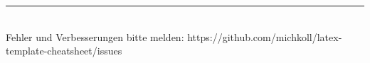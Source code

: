 \rule{0.3\linewidth}{0.25pt}
\\Fehler und Verbesserungen bitte melden: https://github.com/michkoll/latex-template-cheatsheet/issues
\scriptsize


